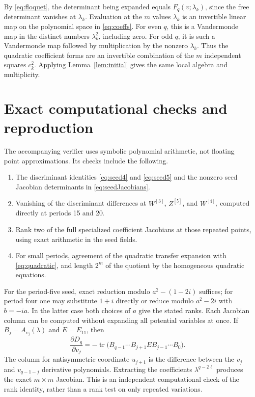 \documentclass[11pt,a4paper]{article}
\theoremstyle{definition}
\theoremstyle{remark}
\newcommand{\tr}{\operatorname{tr}}
\begin{document}
By \eqref{eq:floquet}, the determinant being expanded equals
$F_q(v;\lambda_k)$, since the free determinant vanishes at $\lambda_k$.
Evaluation at the $m$ values $\lambda_k$ is an invertible linear map on
the polynomial space in \eqref{eq:coeffs}. For even $q$, this is a
Vandermonde map in the distinct numbers $\lambda_k^2$, including zero.
For odd $q$, it is such a Vandermonde map followed by multiplication by
the nonzero $\lambda_k$. Thus the quadratic coefficient forms are an
invertible combination of the $m$ independent squares $c_k^2$. Applying
Lemma~\ref{lem:initial} gives the same local algebra and multiplicity.

\section{Exact computational checks and reproduction}

The accompanying verifier uses symbolic polynomial arithmetic, not floating
point approximations. Its checks include the following.
\begin{enumerate}
\item The discriminant identities \eqref{eq:seed4} and \eqref{eq:seed5} and
      the nonzero seed Jacobian determinants in \eqref{eq:seedJacobians}.
\item Vanishing of the discriminant differences at $W^{[3]}$, $Z^{[5]}$,
      and $W^{[4]}$, computed directly at periods 15 and 20.
\item Rank two of the full specialized coefficient Jacobians at those
      repeated points, using exact arithmetic in the seed fields.
\item For small periods, agreement of the quadratic transfer expansion
      with \eqref{eq:quadratic}, and length $2^m$ of the quotient by the
      homogeneous quadratic equations.
\end{enumerate}
For the period-five seed, exact reduction modulo $a^2-(1-2i)$ suffices;
for period four one may substitute $1+i$ directly or reduce modulo $a^2-2i$
with $b=-ia$. In the latter case both choices of $a$ give the stated ranks.
Each Jacobian column can be computed without expanding all potential
variables at once. If $B_j=A_{v_j}(\lambda)$ and $E=E_{11}$, then
\[
 \frac{\partial D_q}{\partial v_j}
   =-\tr\bigl(B_{q-1}\cdots B_{j+1}E B_{j-1}\cdots B_0\bigr).
\]
The column for antisymmetric coordinate $u_{j+1}$ is the difference
between the $v_j$ and $v_{q-1-j}$ derivative polynomials. Extracting the
coefficients $\lambda^{q-2\ell}$ produces the exact $m\times m$ Jacobian.
This is an independent computational check of the rank identity, rather
than a rank test on only repeated variations.
\end{document}
